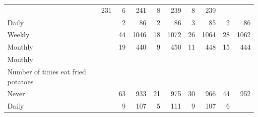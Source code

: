 \documentclass{article}
\begin{document}
\begin{table}[!h]
{\begin{tabular}{lllllllll}
			\multicolumn{1}{r}{231} &
			\multicolumn{1}{r}{6} &
			\multicolumn{1}{r}{241} &
			\multicolumn{1}{r}{8} &
			\multicolumn{1}{r}{239} &
			\multicolumn{1}{r}{8} &
			\multicolumn{1}{r}{239} \\
			\multicolumn{1}{l}{\hspace{5em}Daily} &
			\multicolumn{1}{|r}{2} &
			\multicolumn{1}{r}{86} &
			\multicolumn{1}{r}{2} &
			\multicolumn{1}{r}{86} &
			\multicolumn{1}{r}{3} &
			\multicolumn{1}{r}{85} &
			\multicolumn{1}{r}{2} &
			\multicolumn{1}{r}{86} \\
			\multicolumn{1}{l}{\hspace{5em}Weekly} &
			\multicolumn{1}{|r}{44} &
			\multicolumn{1}{r}{1046} &
			\multicolumn{1}{r}{18} &
			\multicolumn{1}{r}{1072} &
			\multicolumn{1}{r}{26} &
			\multicolumn{1}{r}{1064} &
			\multicolumn{1}{r}{28} &
			\multicolumn{1}{r}{1062} \\
			\multicolumn{1}{l}{\hspace{5em}Monthly} &
			\multicolumn{1}{|r}{19} &
			\multicolumn{1}{r}{440} &
			\multicolumn{1}{r}{9} &
			\multicolumn{1}{r}{450} &
			\multicolumn{1}{r}{11} &
			\multicolumn{1}{r}{448} &
			\multicolumn{1}{r}{15} &
			\multicolumn{1}{r}{444} \\
			\multicolumn{1}{l}{\hspace{3em}Monthly} &
			\multicolumn{1}{|r}{} &
			\multicolumn{1}{r}{} &
			\multicolumn{1}{r}{} &
			\multicolumn{1}{r}{} &
			\multicolumn{1}{r}{} &
			\multicolumn{1}{r}{} &
			\multicolumn{1}{r}{} &
			\multicolumn{1}{r}{} \\
			\multicolumn{1}{l}{\hspace{4em}Number of times eat fried potatoes} &
			\multicolumn{1}{|r}{} &
			\multicolumn{1}{r}{} &
			\multicolumn{1}{r}{} &
			\multicolumn{1}{r}{} &
			\multicolumn{1}{r}{} &
			\multicolumn{1}{r}{} &
			\multicolumn{1}{r}{} &
			\multicolumn{1}{r}{} \\
			\multicolumn{1}{l}{\hspace{5em}Never} &
			\multicolumn{1}{|r}{63} &
			\multicolumn{1}{r}{933} &
			\multicolumn{1}{r}{21} &
			\multicolumn{1}{r}{975} &
			\multicolumn{1}{r}{30} &
			\multicolumn{1}{r}{966} &
			\multicolumn{1}{r}{44} &
			\multicolumn{1}{r}{952} \\
			\multicolumn{1}{l}{\hspace{5em}Daily} &
			\multicolumn{1}{|r}{9} &
			\multicolumn{1}{r}{107} &
			\multicolumn{1}{r}{5} &
			\multicolumn{1}{r}{111} &
			\multicolumn{1}{r}{9} &
			\multicolumn{1}{r}{107} &
			\multicolumn{1}{r}{6} &

\end{tabular}}
\end{table}
\end{document}
